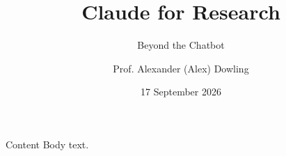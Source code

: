 \documentclass{beamer}
\title{Claude for Research}
\subtitle{Beyond the Chatbot}
\author{Prof. Alexander (Alex) Dowling}
\institute{Chemical and Biomolecular Engineering \\ adowling@nd.edu}
\date{17 September 2026}
\begin{document}
{
\begin{frame}[plain]\titlepage\end{frame}
}
\begin{frame}{Content}
Body text.
\end{frame}
\end{document}
